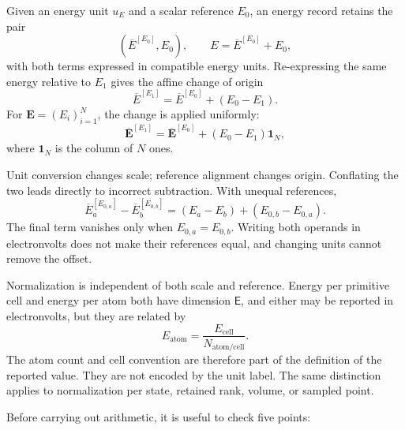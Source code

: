 \begin{definition}
\label{def:training-reference-dependent-energy}
Given an energy unit \(u_E\) and a scalar reference \(E_0\), an energy record
retains the pair
\begin{equation}
  \left(\overline E^{[E_0]},E_0\right),
  \qquad
  E=\overline E^{[E_0]}+E_0,
\end{equation}
with both terms expressed in compatible energy units. Re-expressing the same
energy relative to \(E_1\) gives the affine change of origin
\begin{equation}
  \overline E^{[E_1]}
  =\overline E^{[E_0]}+(E_0-E_1).
  \label{eq:training-energy-reference-change}
\end{equation}
For \(\mathbf E=(E_i)_{i=1}^{N}\), the change is applied uniformly:
\begin{equation}
  \overline{\mathbf E}^{[E_1]}
  =\overline{\mathbf E}^{[E_0]}
  +(E_0-E_1)\mathbf 1_N,
\end{equation}
where \(\mathbf 1_N\) is the column of \(N\) ones.
\end{definition}

Unit conversion changes scale; reference alignment changes origin. Conflating
the two leads directly to incorrect subtraction. With unequal references,
\begin{equation}
  \overline E_a^{[E_{0,a}]}
  -\overline E_b^{[E_{0,b}]}
  =(E_a-E_b)+(E_{0,b}-E_{0,a}).
  \label{eq:training-energy-reference-mismatch}
\end{equation}
The final term vanishes only when \(E_{0,a}=E_{0,b}\). Writing both operands
in electronvolts does not make their references equal, and changing units cannot
remove the offset.

Normalization is independent of both scale and reference. Energy per primitive
cell and energy per atom both have dimension \(\mathsf E\), and either may be
reported in electronvolts, but they are related by
\begin{equation}
  E_{\mathrm{atom}}
  =\frac{E_{\mathrm{cell}}}{N_{\mathrm{atom/cell}}}.
  \label{eq:training-energy-normalization}
\end{equation}
The atom count and cell convention are therefore part of the definition of the
reported value. They are not encoded by the unit label. The same distinction
applies to normalization per state, retained rank, volume, or sampled point.

Before carrying out arithmetic, it is useful to check five points:

